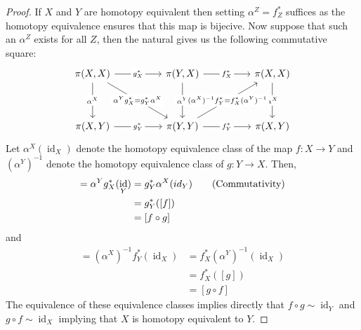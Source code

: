 \documentclass[40pt]{article}
\DeclareMathOperator{\id}{\text{id}}
\begin{document}
	\begin{proof}
		If $X$ and $Y$ are homotopy equivalent then setting $\alpha^Z = f_Z^*$ suffices as the homotopy equivalence ensures that this map is bijecive. Now suppose that such an $\alpha^Z$ exists for all $Z$, then the natural gives us the following commutative square:
\[
			\begin{tikzcd}
				{\pi(X,X)} && {\pi(Y,X)} && {\pi(X,X)} \\
				\\
				{\pi(X,Y)} && {\pi(Y,Y)} && {\pi(X,Y)}
				\arrow["{g^*_X}"{description}, from=1-1, to=1-3]
				\arrow["{\alpha^X}"{description}, from=1-1, to=3-1]
				\arrow["{\alpha^Yg^*_X = g_Y^*\alpha^X}"{description}, from=1-1, to=3-3]
				\arrow["{f^*_X}"{description}, from=1-3, to=1-5]
				\arrow["{\alpha^Y}"{description}, from=1-3, to=3-3]
				\arrow["{\alpha^X}"{description}, from=1-5, to=3-5]
				\arrow["{g^*_Y}"{description}, from=3-1, to=3-3]
				\arrow["{(\alpha^X)^{-1}f_Y^*=f_X^*(\alpha^Y)^{-1}}"{description}, from=3-3, to=1-5]
				\arrow["{f^*_Y}"{description}, from=3-3, to=3-5]
			\end{tikzcd}
\]
Let $\alpha^X(\id_X)$ denote the homotopy equivalence class of the map $f: X\rightarrow Y$ and $(\alpha^Y)^{-1}$ denote the homotopy equivalence class of $g : Y \rightarrow X$. Then,
\begin{align}
	[\id_X] = \alpha^Yg_X^*(\id_Y) &= g_Y^*\alpha^X(id_Y) \tag{\text{Commutativity}} \\
	&= g_Y^*([f]) \\
	&= [f \circ g]
\end{align}
and 
\begin{align}
	[\id_Y] = (\alpha^X)^{-1}f_Y^*(\id_X) &= f_X^* (\alpha^Y)^{-1}(\id_X) \\
	&= f_X^*([g]) \\
	&= [g \circ f]
\end{align}
The equivalence of these equivalence classes implies directly that $f \circ g\sim\id_Y$ and $g \circ f \sim \id_X$ implying that $X$ is homotopy equivalent to $Y$. 
	\end{proof}
\end{document}
